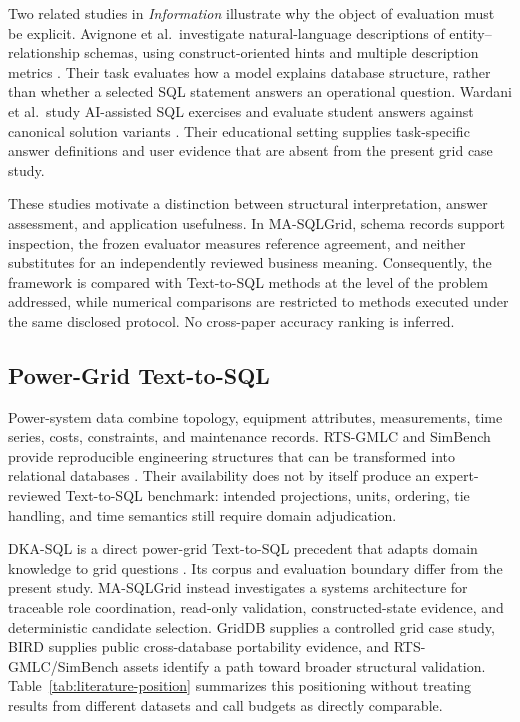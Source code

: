 \documentclass[information,article,submit,moreauthors]{Definitions/mdpi}
\newcommand{\masql}{MA-SQLGrid}
\begin{document}
Two related studies in \emph{Information} illustrate why the object of evaluation must be explicit. Avignone et al.\ investigate natural-language descriptions of entity--relationship schemas, using construct-oriented hints and multiple description metrics \cite{avignone2025exploring}. Their task evaluates how a model explains database structure, rather than whether a selected SQL statement answers an operational question. Wardani et al.\ study AI-assisted SQL exercises and evaluate student answers against canonical solution variants \cite{wardani2026sql}. Their educational setting supplies task-specific answer definitions and user evidence that are absent from the present grid case study.

These studies motivate a distinction between structural interpretation, answer assessment, and application usefulness. In \masql{}, schema records support inspection, the frozen evaluator measures reference agreement, and neither substitutes for an independently reviewed business meaning. Consequently, the framework is compared with Text-to-SQL methods at the level of the problem addressed, while numerical comparisons are restricted to methods executed under the same disclosed protocol. No cross-paper accuracy ranking is inferred.

\subsection{Power-Grid Text-to-SQL}

Power-system data combine topology, equipment attributes, measurements, time series, costs, constraints, and maintenance records. RTS-GMLC and SimBench provide reproducible engineering structures that can be transformed into relational databases \cite{barrows2020rts,meinecke2020simbench}. Their availability does not by itself produce an expert-reviewed Text-to-SQL benchmark: intended projections, units, ordering, tie handling, and time semantics still require domain adjudication.

DKA-SQL is a direct power-grid Text-to-SQL precedent that adapts domain knowledge to grid questions \cite{bian2025dkasql}. Its corpus and evaluation boundary differ from the present study. \masql{} instead investigates a systems architecture for traceable role coordination, read-only validation, constructed-state evidence, and deterministic candidate selection. GridDB supplies a controlled grid case study, BIRD supplies public cross-database portability evidence, and RTS-GMLC/SimBench assets identify a path toward broader structural validation. Table~\ref{tab:literature-position} summarizes this positioning without treating results from different datasets and call budgets as directly comparable.
\end{document}
